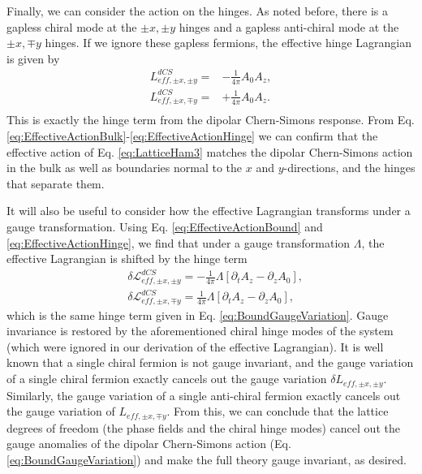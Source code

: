 \documentclass[prb,aps,twocolumn,groupaddress,floatfix]{revtex4-1}
\begin{document}
Finally, we can consider the action on the hinges. As noted before, there is a gapless chiral mode at the $\pm x, \pm y$ hinges and a gapless anti-chiral mode at the $\pm x, \mp y$ hinges.  If we ignore these gapless fermions, the effective hinge Lagrangian is given by
\begin{equation}
\begin{split}
L^{dCS}_{eff,\pm x, \pm y} =& -\frac{1}{4\pi}A_0 A_z, \\
L^{dCS}_{eff,\pm x, \mp y} =& + \frac{1}{4\pi}A_0 A_z .\\
\end{split}\label{eq:EffectiveActionHinge}
\end{equation}
This is exactly the hinge term from the dipolar Chern-Simons response. From Eq. \ref{eq:EffectiveActionBulk}-\ref{eq:EffectiveActionHinge} we can confirm that the effective action of Eq. \ref{eq:LatticeHam3} matches the dipolar Chern-Simons action in the bulk as well as boundaries normal to the $x$ and $y$-directions, and the hinges that separate them. 

It will also be useful to consider how the effective Lagrangian transforms under a gauge transformation. Using Eq. \ref{eq:EffectiveActionBound} and \ref{eq:EffectiveActionHinge}, we find that under a gauge transformation $\Lambda$, the effective Lagrangian is shifted by the hinge term
\begin{equation}
\begin{split}
&\delta\mathcal{L}^{dCS}_{eff,\pm x,\pm y} = -\frac{1}{4\pi} \Lambda [\partial_t A_z - \partial_z A_0],\\&
\delta \mathcal{L}^{dCS}_{eff,\pm x,\mp y} = \frac{1}{4\pi}  \Lambda [\partial_t A_z - \partial_z A_0],
\end{split}
\label{eq:EffectiveHingeGaugeVariation}\end{equation}
which is the same hinge term given in Eq. \ref{eq:BoundGaugeVariation}. Gauge invariance is restored by the aforementioned chiral hinge modes of the system (which were ignored in our derivation of the effective Lagrangian). It is well known that a single chiral fermion is not gauge invariant, and the gauge variation of a single chiral fermion exactly cancels out the gauge variation $\delta L_{eff,\pm x, \pm y} $\cite{naculich1988axionic,chandrasekharan1994}. Similarly, the gauge variation of a single anti-chiral fermion exactly cancels out the gauge variation of $L_{eff,\pm x, \mp y} $. From this, we can conclude that the lattice degrees of freedom (the phase fields and the chiral hinge modes) cancel out the gauge anomalies of the dipolar Chern-Simons action (Eq. \ref{eq:BoundGaugeVariation}) and make the full theory gauge invariant, as desired.
\end{document}
